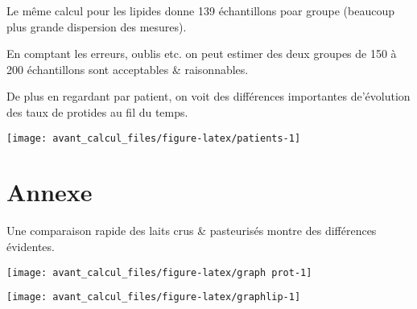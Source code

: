 \documentclass[]{tufte-handout}
\begin{document}
Le même calcul pour les lipides donne 139 échantillons poar groupe
(beaucoup plus grande dispersion des mesures).

En comptant les erreurs, oublis etc. on peut estimer des deux groupes de
150 à 200 échantillons sont acceptables \& raisonnables.

De plus en regardant par patient, on voit des différences importantes
de'évolution des taux de protides au fil du temps.

\texttt{[image: avant\_calcul\_files/figure-latex/patients-1]}

\hypertarget{annexe}{%
\section{Annexe}\label{annexe}}

Une comparaison rapide des laits crus \& pasteurisés montre des
différences évidentes.

\texttt{[image: avant\_calcul\_files/figure-latex/graph prot-1]}

\texttt{[image: avant\_calcul\_files/figure-latex/graphlip-1]}
\end{document}
